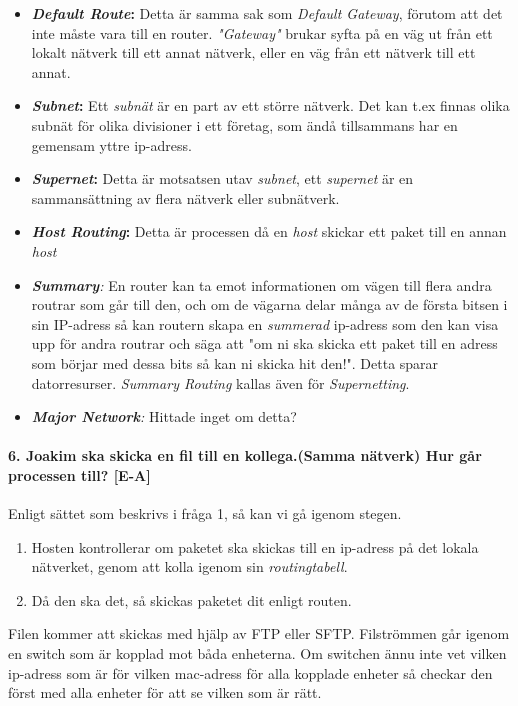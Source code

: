 \begin{itemize}
	\item \textbf{\textit{Default Route}:} Detta är samma sak som \textit{Default Gateway}, förutom att det inte måste vara till en router. \textit{"Gateway"} brukar syfta på en väg ut från ett lokalt nätverk till ett annat nätverk, eller en väg från ett nätverk till ett annat.
	\item \textbf{\textit{Subnet}:} Ett \textit{subnät} är en part av ett större nätverk. Det kan t.ex finnas olika subnät för olika divisioner i ett företag, som ändå tillsammans har en gemensam yttre ip-adress.
	\item \textbf{\textit{Supernet}:} Detta är motsatsen utav \textit{subnet}, ett \textit{supernet} är en sammansättning av flera nätverk eller subnätverk. 
	\item \textbf{\textit{Host Routing}:} Detta är processen då en \textit{host} skickar ett paket till en annan \textit{host}
	\item \textit{\textbf{Summary}:} En router kan ta emot informationen om vägen till flera andra routrar som går till den, och om de vägarna delar många av de första bitsen i sin IP-adress så kan routern skapa en \textit{summerad} ip-adress som den kan visa upp för andra routrar och säga att "om ni ska skicka ett paket till en adress som börjar med dessa bits så kan ni skicka hit den!". Detta sparar datorresurser. \textit{Summary Routing} kallas även för \textit{Supernetting}.
	\item \textit{\textbf{Major Network}:} Hittade inget om detta?
\end{itemize}


\paragraph{6. Joakim ska skicka en fil till en kollega.(Samma nätverk) Hur går processen till? [E-A]}

Enligt sättet som beskrivs i fråga 1, så kan vi gå igenom stegen.

\begin{enumerate}
	\item Hosten kontrollerar om paketet ska skickas till en ip-adress på det lokala nätverket, genom att kolla igenom sin \textit{routingtabell}.
	\item Då den ska det, så skickas paketet dit enligt routen.
\end{enumerate}

Filen kommer att skickas med hjälp av FTP eller SFTP. Filströmmen går igenom en switch som är kopplad mot båda enheterna. Om switchen ännu inte vet vilken ip-adress som är för vilken mac-adress för alla kopplade enheter så checkar den först med alla enheter för att se vilken som är rätt.

